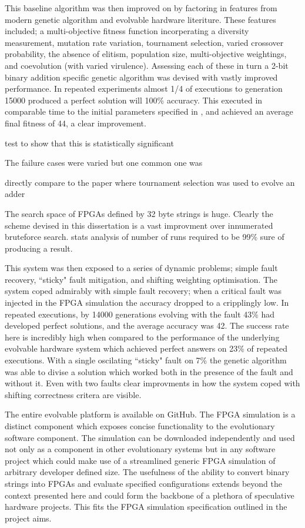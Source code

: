 This baseline algorithm was then improved on by factoring in features from
modern genetic algorithm and evolvable hardware literiture.
These features included; a
multi-objective fitness function incorperating a diversity measurement,
mutation rate variation, tournament selection, varied crossover probability,
the absence of elitism, population size, multi-objective weightings, and
coevolution (with varied virulence). Assessing each of these in turn
a 2-bit binary addition specific genetic algorithm was devised with vastly
improved performance. In repeated experiments almost 1/4 of executions to
generation 15000 produced a perfect solution will 100\% accuracy. This
executed in comparable time to the initial parameters specified in
\cite{10.1007/3-540-63173-9_61}, and achieved an average final fitness of 44,
a clear improvement.

\todo test to show that this is statistically significant

\todo The failure cases were varied but one common one was 

\todo directly compare to the paper where tournament selection was used to evolve an adder

The search space of FPGAs defined by 32 byte strings is huge. Clearly the
scheme devised in this dissertation is a vast improvment over innumerated bruteforce
search. \todo stats analysis of number of runs required to be 99\% sure of producing a
result.

This system was then exposed to a series of dynamic problems; simple fault
recovery, ``sticky" fault mitigation, and shifting weighting optimisation.
The system coped admirably with simple fault recovery; when a critical fault
was injected in the FPGA simulation the accuracy dropped to a cripplingly low.
In repeated executions, by 14000 generations evolving with the fault 43\%
had developed perfect solutions, and the average accuracy was 42. The success
rate here is incredibly high when compared to the performance of the underlying
evolvable hardware system which achieved perfect answers on 23\% of repeated executions.
With a single oscilating ``sticky" fault on 7\% the genetic algorithm was
able to divise a solution which worked both in the presence of the fault and without
it. Even with two faults clear improvments in how the system coped with shifting
correctness critera are visible.

The entire evolvable platform is available on GitHub. The FPGA simulation
is a distinct component which exposes concise functionality to the evolutionary
software component. The simulation can be downloaded independently and used
not only as a component in other evolutionary systems but in any software project
which could make use of a streamlined generic FPGA simulation of arbitrary developer
defined size. The usefulness of the ability to convert binary strings into FPGAs and evaluate specified
configurations extends beyond the context presented here and could form the backbone
of a plethora of speculative hardware projects. This fits the FPGA simulation
specification outlined in the project aims.

